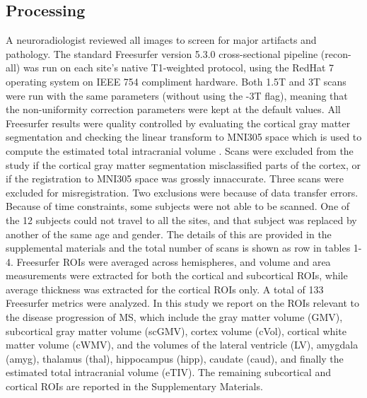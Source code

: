 \subsection{Processing}
 A neuroradiologist reviewed all images to screen for major artifacts and pathology. The standard Freesurfer \cite{freesurferPaper} version 5.3.0 cross-sectional pipeline (recon-all) was run on each site's native T1-weighted protocol, using the RedHat 7 operating system on IEEE 754 compliment hardware. Both 1.5T and 3T scans were run with the same parameters (without using the -3T flag), meaning that the non-uniformity correction parameters were kept at the default values. All Freesurfer results were quality controlled by evaluating the cortical gray matter segmentation and checking the  linear transform to MNI305 space which is used to compute the estimated total intracranial volume \cite{buckner2004unified}. Scans were excluded from the study if the cortical gray matter segmentation misclassified parts of the cortex, or if the registration to MNI305 space was grossly innaccurate. Three scans were excluded for misregistration. Two exclusions were because of data transfer errors. Because of time constraints, some subjects were not able to be scanned. One of the 12 subjects could not travel to all the sites, and that subject was replaced by another of the same age and gender. The details of this are provided in the supplemental materials and the total number of scans is shown as row in tables 1-4. Freesurfer ROIs were averaged across hemispheres, and volume and area measurements were extracted for both the cortical and subcortical ROIs, while average thickness was extracted for the cortical ROIs only. A total of 133 Freesurfer metrics were analyzed. In this study we report on the ROIs relevant to the disease progression of MS, which include the gray matter volume (GMV), subcortical gray matter volume (scGMV), cortex volume (cVol), cortical white matter volume (cWMV), and the volumes of the lateral ventricle (LV), amygdala (amyg), thalamus (thal), hippocampus (hipp), caudate (caud), and finally the estimated total intracranial volume (eTIV). The remaining subcortical  and cortical ROIs are reported in the Supplementary Materials.